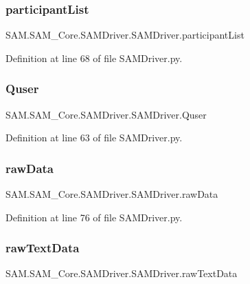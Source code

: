 \subsubsection{\texorpdfstring{participant\+List}{participantList}}
{\footnotesize\ttfamily S\+A\+M.\+S\+A\+M\+\_\+\+Core.\+S\+A\+M\+Driver.\+S\+A\+M\+Driver.\+participant\+List}



Definition at line 68 of file S\+A\+M\+Driver.\+py.

\mbox{\label{group__icubclient__SAM__Drivers_gafa17acba2ab91a5988b535ab129694e7}} 
\subsubsection{\texorpdfstring{Quser}{Quser}}
{\footnotesize\ttfamily S\+A\+M.\+S\+A\+M\+\_\+\+Core.\+S\+A\+M\+Driver.\+S\+A\+M\+Driver.\+Quser}



Definition at line 63 of file S\+A\+M\+Driver.\+py.

\mbox{\label{group__icubclient__SAM__Drivers_ga7e5bd4edc32a108d5641cf7343887b6c}} 
\subsubsection{\texorpdfstring{raw\+Data}{rawData}}
{\footnotesize\ttfamily S\+A\+M.\+S\+A\+M\+\_\+\+Core.\+S\+A\+M\+Driver.\+S\+A\+M\+Driver.\+raw\+Data}



Definition at line 76 of file S\+A\+M\+Driver.\+py.

\mbox{\label{group__icubclient__SAM__Drivers_ga34a0d852321cad5abdc8fd4d514e60fa}} 
\subsubsection{\texorpdfstring{raw\+Text\+Data}{rawTextData}}
{\footnotesize\ttfamily S\+A\+M.\+S\+A\+M\+\_\+\+Core.\+S\+A\+M\+Driver.\+S\+A\+M\+Driver.\+raw\+Text\+Data}



